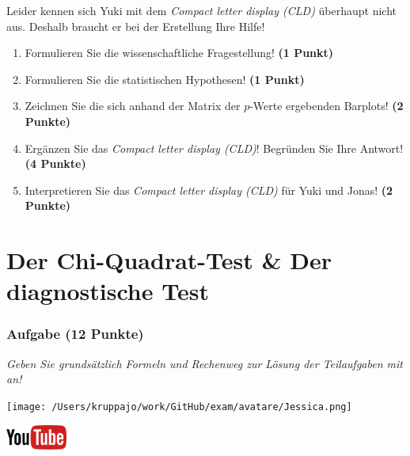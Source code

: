 \documentclass[a4paper, 9pt]{scrartcl}\usepackage[]{graphicx}\usepackage[]{xcolor}
\begin{document}
Leider kennen sich Yuki mit dem \textit{Compact letter display (CLD)} überhaupt nicht aus. Deshalb braucht er bei der Erstellung Ihre Hilfe!

\begin{enumerate}
  \item Formulieren Sie die wissenschaftliche Fragestellung! \textbf{(1 Punkt)}
  \item Formulieren Sie die statistischen Hypothesen! \textbf{(1 Punkt)}
\item Zeichnen Sie die sich anhand der Matrix der $p$-Werte ergebenden Barplots! \textbf{(2 Punkte)}
\item Ergänzen Sie das \textit{Compact letter display (CLD)}! Begründen Sie Ihre Antwort! \textbf{(4 Punkte)}
\item Interpretieren Sie das \textit{Compact letter display (CLD)} für Yuki und Jonas! \textbf{(2 Punkte)} 
\end{enumerate}

 
\clearpage
\part{Der Chi-Quadrat-Test \& Der diagnostische Test}

\section{Aufgabe \hfill (12 Punkte)}

\textit{Geben Sie grundsätzlich Formeln und Rechenweg zur Lösung der Teilaufgaben mit an!} \\[1Ex]
 

 
\begin{minipage}[t]{0.5\textwidth}
\texttt{[image: /Users/kruppajo/work/GitHub/exam/avatare/Jessica.png]}
\end{minipage}
\begin{minipage}[t]{0.5\textwidth}
\hfill
\href{https://youtu.be/-Kva5wc5Elw}{\includegraphics[width = 2cm]{img/youtube}}\\[1Ex]
\end{minipage}
\vspace{1ex}
\end{document}
